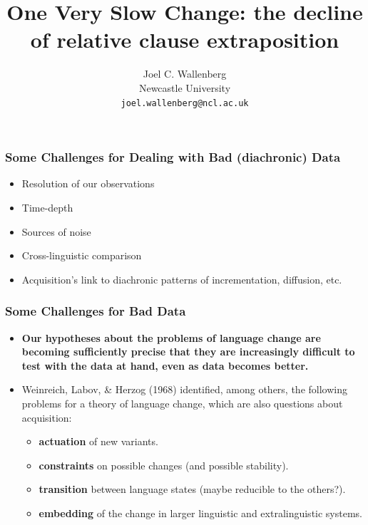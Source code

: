 \documentclass[hyperref={pdfpagelabels=false}]{beamer}
\title{One Very Slow Change: the decline of relative clause extraposition}
\author{Joel C. Wallenberg\\Newcastle University\\
    \texttt{joel.wallenberg@ncl.ac.uk}}
\institute{Bad Data Workshop}
\begin{document}
\begin{frame}[plain]
\titlepage
\end{frame}

\begin{frame}
\frametitle{Some Challenges for Dealing with Bad (diachronic) Data}
\begin{itemize}
	\item Resolution of our observations
	\item Time-depth
	\item Sources of noise
	\item Cross-linguistic comparison
	\item Acquisition's link to diachronic patterns of incrementation, diffusion, etc.
\end{itemize}
\end{frame}

\begin{frame}
\frametitle{Some Challenges for Bad Data}
\begin{itemize}
	\item \textbf{Our hypotheses about the problems of language change are becoming sufficiently precise that they are increasingly difficult to test with the data at hand, even as data becomes better.}
	\item \nocite{wlh1968} Weinreich, Labov, \& Herzog (1968) identified, among others, the following problems for a theory of language change, which are also questions about acquisition:
	\begin{itemize}
		\item \textbf{actuation} of new variants.
		\item \textbf{constraints} on possible changes (and possible stability).
		\item \textbf{transition} between language states (maybe reducible to the others?).
		\item \textbf{embedding} of the change in larger linguistic and extralinguistic systems.
	\end{itemize}
\end{itemize}
\end{frame}
\end{document}
